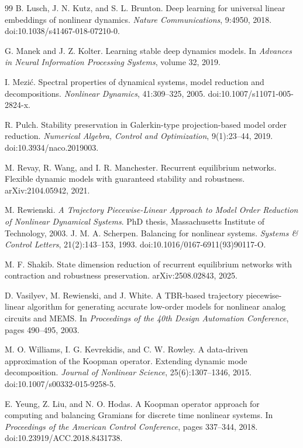 \documentclass{l4dc2027}
\begin{document}
\begin{thebibliography}{99}
B. Lusch, J. N. Kutz, and S. L. Brunton.
\newblock Deep learning for universal linear embeddings of nonlinear dynamics.
\newblock \emph{Nature Communications}, 9:4950, 2018.
\newblock doi:10.1038/s41467-018-07210-0.

G. Manek and J. Z. Kolter.
\newblock Learning stable deep dynamics models.
\newblock In \emph{Advances in Neural Information Processing Systems}, volume 32, 2019.

I. Mezi\'c.
\newblock Spectral properties of dynamical systems, model reduction and decompositions.
\newblock \emph{Nonlinear Dynamics}, 41:309--325, 2005.
\newblock doi:10.1007/s11071-005-2824-x.

R. Pulch.
\newblock Stability preservation in Galerkin-type projection-based model order reduction.
\newblock \emph{Numerical Algebra, Control and Optimization}, 9(1):23--44, 2019.
\newblock doi:10.3934/naco.2019003.

M. Revay, R. Wang, and I. R. Manchester.
\newblock Recurrent equilibrium networks. Flexible dynamic models with guaranteed stability and robustness.
\newblock arXiv:2104.05942, 2021.

M. Rewienski.
\newblock \emph{A Trajectory Piecewise-Linear Approach to Model Order Reduction of Nonlinear Dynamical Systems}.
\newblock PhD thesis, Massachusetts Institute of Technology, 2003.
J. M. A. Scherpen.
\newblock Balancing for nonlinear systems.
\newblock \emph{Systems \& Control Letters}, 21(2):143--153, 1993.
\newblock doi:10.1016/0167-6911(93)90117-O.

M. F. Shakib.
\newblock State dimension reduction of recurrent equilibrium networks with contraction and robustness preservation.
\newblock arXiv:2508.02843, 2025.

D. Vasilyev, M. Rewienski, and J. White.
\newblock A TBR-based trajectory piecewise-linear algorithm for generating accurate low-order models for nonlinear analog circuits and MEMS.
\newblock In \emph{Proceedings of the 40th Design Automation Conference}, pages 490--495, 2003.

M. O. Williams, I. G. Kevrekidis, and C. W. Rowley.
\newblock A data-driven approximation of the Koopman operator. Extending dynamic mode decomposition.
\newblock \emph{Journal of Nonlinear Science}, 25(6):1307--1346, 2015.
\newblock doi:10.1007/s00332-015-9258-5.

E. Yeung, Z. Liu, and N. O. Hodas.
\newblock A Koopman operator approach for computing and balancing Gramians for discrete time nonlinear systems.
\newblock In \emph{Proceedings of the American Control Conference}, pages 337--344, 2018.
\newblock doi:10.23919/ACC.2018.8431738.

\end{thebibliography}
\clearpage
\appendix
\end{document}
